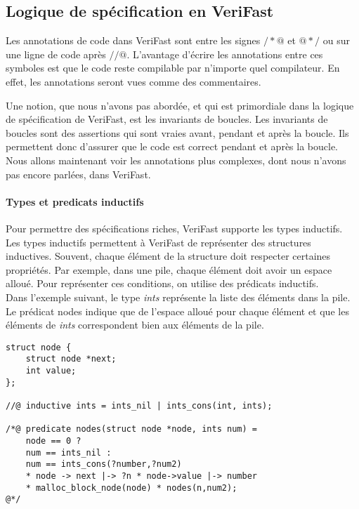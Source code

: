 \documentclass[11pt,openany]{article}
\newcommand{\verifast}{VeriFast}
\begin{document}
		
	\subsection{Logique de sp\'ecification en \verifast{}}
		Les annotations de code dans \verifast{} sont entre les signes $/*@$ et $@*/$ ou sur une ligne de code apr\`es $//@$. L'avantage d'\'ecrire les annotations entre ces symboles est que le code reste compilable par n'importe quel compilateur. En effet, les annotations seront vues comme des commentaires.
		
		Une notion, que nous n'avons pas abord\'ee, et qui est primordiale dans la logique de sp\'ecification de \verifast, est les invariants de boucles. Les invariants de boucles sont des assertions qui sont vraies avant, pendant et apr\`es la boucle. Ils permettent donc d'assurer que le code est correct pendant et apr\`es la boucle. Nous allons maintenant voir les annotations plus complexes, dont nous n'avons pas encore parl\'ees, dans \verifast.
			\paragraph{Types et predicats inductifs}
		
				Pour permettre des sp\'ecifications riches, \verifast{} supporte les types inductifs. Les types inductifs permettent \`a \verifast{} de repr\'esenter des structures inductives. Souvent, chaque \'el\'ement de la structure doit respecter certaines propri\'et\'es. Par exemple, dans une pile, chaque \'el\'ement doit avoir un espace allou\'e.	Pour repr\'esenter ces conditions, on utilise des pr\'edicats inductifs.\\ Dans l'exemple suivant, le type \textit{ints} repr\'esente la liste des \'el\'ements dans la pile. Le pr\'edicat nodes indique que de l'espace allou\'e pour chaque \'el\'ement et que les \'el\'ements de \textit{ints} correspondent bien aux \'el\'ements de la pile.
				
			
			\begin{lstlisting}
struct node {
	struct node *next;
	int value;
};
				
//@ inductive ints = ints_nil | ints_cons(int, ints);

/*@ predicate nodes(struct node *node, ints num) =
	node == 0 ?
	num == ints_nil :
	num == ints_cons(?number,?num2) 
	* node -> next |-> ?n * node->value |-> number
	* malloc_block_node(node) * nodes(n,num2);
@*/
	
			\end{lstlisting}			
\end{document}
